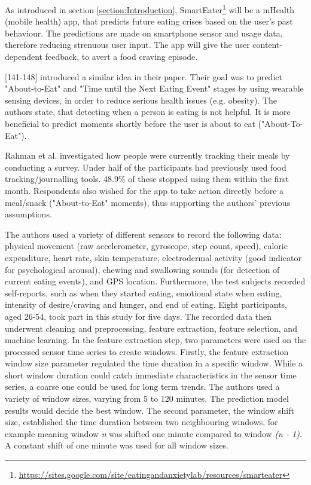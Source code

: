 
As introduced in section \ref{section:Introduction}, SmartEater\footnote{\url{https://sites.google.com/site/eatingandanxietylab/resources/smarteater}} will be a mHealth (mobile health) app, that predicts future eating crises based on the user's past behaviour. The predictions are made on smartphone sensor and usage data, therefore reducing strenuous user input. The app will give the user content-dependent feedback, to avert a food craving episode. 

\textcite{AboutToEat2016Rahman}[141-148] introduced a similar idea in their paper. Their goal was to predict "About-to-Eat" and "Time until the Next Eating Event" stages by using wearable sensing devices, in order to reduce serious health issues (e.g. obesity). The authors state, that detecting when a person is eating is not helpful. It is more beneficial to predict moments shortly before the user is about to eat ("About-To-Eat").

Rahman et al. investigated how people were currently tracking their meals by conducting a survey. Under half of the participants had previously used food tracking/journalling tools. 48.9\% of these stopped using them within the first month. Respondents also  wished for the app to take action directly before a meal/snack ("About-to-Eat" moments), thus supporting the authors' previous assumptions.

The authors used a variety of different sensors to record the following data: physical movement (raw accelerometer, gyroscope, step count, speed), caloric expenditure, heart rate, skin temperature, electrodermal activity (good indicator for psychological arousal), chewing and swallowing sounds (for detection of current eating events), and GPS location. Furthermore, the test subjects recorded self-reports, such as when they started eating, emotional state when eating, intensity of desire/craving and hunger, and end of eating. Eight participants, aged 26-54, took part in this study for five days. The recorded data then underwent cleaning and preprocessing, feature extraction, feature selection, and machine learning. 
In the feature extraction step, two parameters were used on the processed sensor time series to create windows. Firstly, the feature extraction window size parameter regulated the time duration in a specific window. While a short window duration could catch immediate characteristics in the sensor time series, a coarse one could be used for long term trends. The authors used a variety of window sizes, varying from 5 to 120 minutes. The prediction model results would decide the best window. The second parameter, the window shift size, established the time duration between two neighbouring windows, for example meaning window \textit{n} was shifted one minute compared to window \textit{(n - 1)}. A constant shift of one minute was used for all window sizes. 

